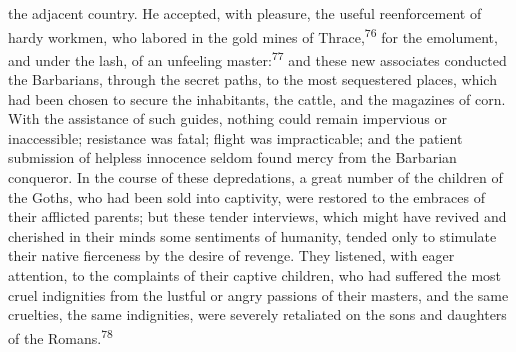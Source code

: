 the adjacent country. He accepted, with pleasure, the useful
reenforcement of hardy workmen, who labored in the gold mines of
Thrace,\textsuperscript{76} for the emolument, and under the lash, of an unfeeling
master:\textsuperscript{77} and these new associates conducted the Barbarians,
through the secret paths, to the most sequestered places, which
had been chosen to secure the inhabitants, the cattle, and the
magazines of corn. With the assistance of such guides, nothing
could remain impervious or inaccessible; resistance was fatal;
flight was impracticable; and the patient submission of helpless
innocence seldom found mercy from the Barbarian conqueror. In the
course of these depredations, a great number of the children of
the Goths, who had been sold into captivity, were restored to the
embraces of their afflicted parents; but these tender interviews,
which might have revived and cherished in their minds some
sentiments of humanity, tended only to stimulate their native
fierceness by the desire of revenge. They listened, with eager
attention, to the complaints of their captive children, who had
suffered the most cruel indignities from the lustful or angry
passions of their masters, and the same cruelties, the same
indignities, were severely retaliated on the sons and daughters
of the Romans.\textsuperscript{78}




